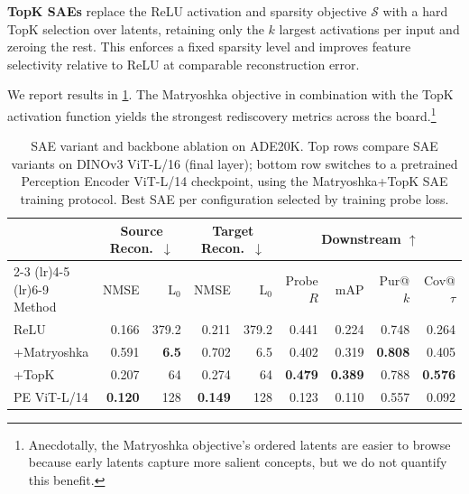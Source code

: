 \documentclass[runningheads]{llncs}
\begin{document}
\textbf{TopK SAEs} \citep{gao2025scaling} replace the ReLU activation and sparsity objective $\mathcal{S}$ with a hard TopK selection over latents, retaining only the $k$ largest activations per input and zeroing the rest.
This enforces a fixed sparsity level and improves feature selectivity relative to ReLU at comparable reconstruction error.

We report results in \cref{tab:ablations}.
The Matryoshka objective in combination with the TopK activation function yields the strongest rediscovery metrics across the board.\footnote{Anecdotally, the Matryoshka objective's ordered latents are easier to browse because early latents capture more salient concepts, but we do not quantify this benefit.}

\begin{table}[t]
    \centering
    \small
    \setlength{\tabcolsep}{3pt}
    \caption{
    SAE variant and backbone ablation on ADE20K.
    Top rows compare SAE variants on DINOv3 ViT-L/16 (final layer); bottom row switches to a pretrained Perception Encoder ViT-L/14 checkpoint, using the Matryoshka+TopK SAE training protocol.
    Best SAE per configuration selected by training probe loss.
    }
    \label{tab:ablations}
    \begin{tabular}{l rr rr rrrr}
    \toprule
    & \multicolumn{2}{c}{Source Recon.\ $\downarrow$} & \multicolumn{2}{c}{Target Recon.\ $\downarrow$} & \multicolumn{4}{c}{Downstream $\uparrow$} \\
    \cmidrule(lr){2-3} \cmidrule(lr){4-5} \cmidrule(lr){6-9}
    Method & NMSE & L$_0$ & NMSE & L$_0$ & Probe $R$ & mAP & Pur@$k$ & Cov@$\tau$ \\
    \midrule
    ReLU & {0.166} & 379.2 & {0.211} & 379.2 & 0.441 & 0.224 & 0.748 & 0.264 \\  %
    +Matryoshka & 0.591 & \textbf{6.5} & 0.702 & 6.5 & 0.402 & 0.319 & \textbf{0.808} & 0.405 \\  %
    +TopK & 0.207 & 64 & 0.274 & 64 & \textbf{0.479} & \textbf{0.389} & 0.788 & \textbf{0.576} \\ %
    \midrule
    PE ViT-L/14 & \textbf{0.120} & 128 & \textbf{0.149} & 128 & 0.123 & 0.110 & 0.557 & 0.092 \\ %
    \bottomrule
    \end{tabular}
\end{table}
\end{document}
